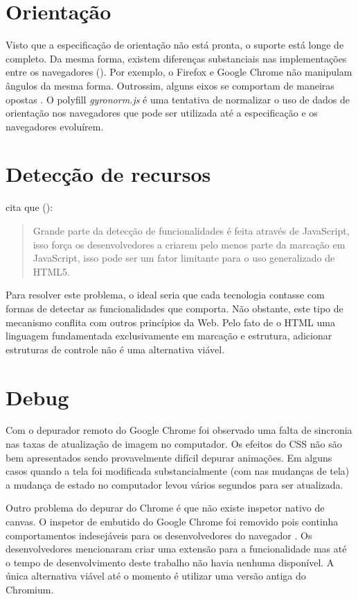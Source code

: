 \section{Orientação}

Visto que a especificação de orientação não está pronta,
o suporte está longe de completo. Da mesma forma, existem
diferenças substanciais nas implementações entre os navegadores
(). Por exemplo, o Firefox e Google
Chrome não manipulam ângulos da mesma forma. Outrossim, alguns
eixos se comportam de maneiras opostas \autocite{mdnOrientation}. O
polyfill \textit{gyronorm.js} é uma tentativa de normalizar o uso de
dados de orientação nos navegadores que pode ser utilizada até a
especificação e os navegadores evoluírem.

\section{Detecção de recursos}

\citet{diveIntohtml} cita que ():
\begin{quote}
Grande parte da detecção de funcionalidades é feita através de
JavaScript, isso força os desenvolvedores a criarem pelo menos parte da
marcação em JavaScript, isso pode ser um fator limitante para o uso
generalizado de HTML5.
\end{quote}

Para resolver este problema, o ideal seria que cada tecnologia contasse
com formas de detectar as funcionalidades que comporta. Não obstante,
este tipo de mecanismo conflita com outros princípios da Web. Pelo
fato de o HTML uma linguagem fundamentada exclusivamente em marcação
e estrutura, adicionar estruturas de controle não é uma alternativa
viável.

\section{Debug}

Com o depurador remoto do Google Chrome foi observado uma falta de
sincronia nas taxas de atualização de imagem no computador. Os
efeitos do CSS não são bem apresentados sendo provavelmente difícil
depurar animações. Em alguns casos quando a tela foi modificada
substancialmente (com nas mudanças de tela) a mudança de estado no
computador levou vários segundos para ser atualizada.

Outro problema do depurar do Chrome é que não existe inspetor nativo
de canvas. O inspetor de embutido do Google Chrome foi removido pois
continha comportamentos indesejáveis para os desenvolvedores do
navegador \autocite{canvasinspector}. Os desenvolvedores mencionaram
criar uma extensão para a funcionalidade mas até o tempo de
desenvolvimento deste trabalho não havia nenhuma disponível. A única
alternativa viável até o momento é utilizar uma versão antiga do
Chromium.

